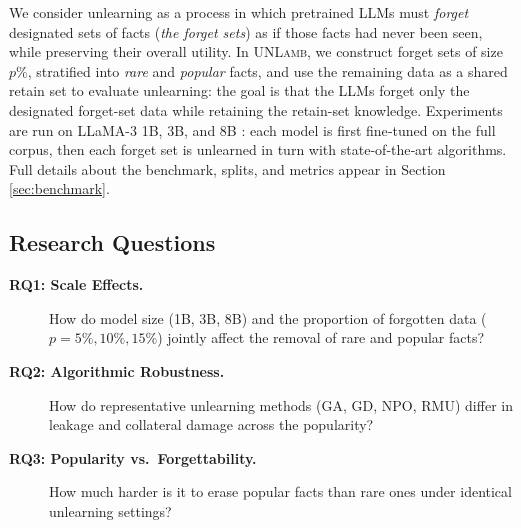 \documentclass[sigconf,anonymous]{aamas}
\begin{document}
We consider unlearning as a process in which pretrained LLMs must \emph{forget} designated sets of facts (\emph{the forget sets}) as if those facts had never been seen, while preserving their overall utility. In \textsc{UNLamb}, we construct forget sets of size $p\%$, stratified into \emph{rare} and \emph{popular} facts, and use the remaining data as a shared retain set to evaluate unlearning: the goal is that the LLMs forget only the designated forget-set data while retaining the retain-set knowledge. %
Experiments are run on LLaMA-3 1B, 3B, and 8B \cite{grattafiori2024llama}: each model is first fine‑tuned on the full corpus, then each forget set is unlearned in turn with state‑of‑the‑art algorithms. Full details about the benchmark, splits, and metrics appear in Section \ref{sec:benchmark}.

\subsection{Research Questions}
\label{sec:rq}


\begin{description}
    \item[\textbf{RQ1: Scale Effects.}]  
     How do model size (1B, 3B, 8B) and the proportion of forgotten data ($p=5\%,10\%,15\%$) jointly affect the removal of rare and popular facts?

     \item[\textbf{RQ2: Algorithmic Robustness.}]  
    How do representative unlearning methods (\textsc{GA}, \textsc{GD}, \textsc{NPO}, \textsc{RMU}) differ in leakage and collateral damage across the popularity?

     \item[\textbf{RQ3: Popularity vs.\ Forgettability.}]  
    How much harder is it to erase popular facts than rare ones under identical unlearning settings?
\end{description}
\end{document}
